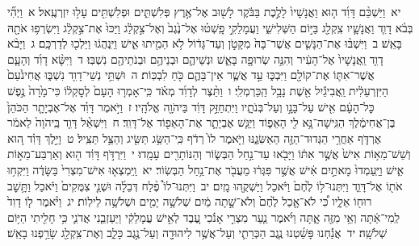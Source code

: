 \documentclass[18pt]{article}
\begin{document}
 {\loc יא~}וַיַּשְׁכֵּ֨ם דָּוִ֜ד ה֤וּא וַאֲנָשָׁיו֙ לָלֶ֣כֶת בַּבֹּ֔קֶר לָשׁ֖וּב אֶל־אֶ֣רֶץ פְּלִשְׁתִּ֑ים וּפְלִשְׁתִּ֖ים עָל֥וּ יִזְרְעֶֽאל׃ 
\startlock
 {\loc א~}וַיְהִ֞י בְּבֹ֨א דָוִ֧ד וַאֲנָשָׁ֛יו צִֽקְלַ֖ג בַּיּ֣וֹם הַשְּׁלִישִׁ֑י וַעֲמָלֵקִ֣י פָֽשְׁט֗וּ אֶל־נֶ֙גֶב֙ וְאֶל־צִ֣קְלַ֔ג וַיַּכּוּ֙ אֶת־צִ֣קְלַ֔ג וַיִּשְׂרְפ֥וּ אֹתָ֖הּ בָּאֵֽשׁ׃ \startlock
 {\loc ב~}וַיִּשְׁבּ֨וּ אֶת־הַנָּשִׁ֤ים אֲשֶׁר־בָּהּ֙ מִקָּטֹ֣ן וְעַד־גָּד֔וֹל לֹ֥א הֵמִ֖יתוּ אִ֑ישׁ וַיִּֽנְהֲג֔וּ וַיֵּלְכ֖וּ לְדַרְכָּֽם׃ \startlock
 {\loc ג~}וַיָּבֹ֨א דָוִ֤ד וַֽאֲנָשָׁיו֙ אֶל־הָעִ֔יר וְהִנֵּ֥ה שְׂרוּפָ֖ה בָּאֵ֑שׁ וּנְשֵׁיהֶ֛ם וּבְנֵיהֶ֥ם וּבְנֹתֵיהֶ֖ם נִשְׁבּֽוּ׃ \startlock
 {\loc ד~}וַיִּשָּׂ֨א דָוִ֜ד וְהָעָ֧ם אֲשֶׁר־אִתּ֛וֹ אֶת־קוֹלָ֖ם וַיִּבְכּ֑וּ עַ֣ד אֲשֶׁ֧ר אֵין־בָּהֶ֛ם כֹּ֖חַ לִבְכּֽוֹת׃ \startlock
 {\loc ה~}וּשְׁתֵּ֥י נְשֵׁי־דָוִ֖ד נִשְׁבּ֑וּ אֲחִינֹ֙עַם֙ הַיִּזְרְעֵלִ֔ית וַֽאֲבִיגַ֕יִל אֵ֖שֶׁת נָבָ֥ל הַֽכַּרְמְלִֽי׃ \startlock
 {\loc ו~}וַתֵּ֨צֶר לְדָוִ֜ד מְאֹ֗ד כִּֽי־אָמְר֤וּ הָעָם֙ לְסׇקְל֔וֹ כִּי־מָ֙רָה֙ נֶ֣פֶשׁ כׇּל־הָעָ֔ם אִ֖ישׁ עַל־בָּנָ֣ו וְעַל־בְּנֹתָ֑יו וַיִּתְחַזֵּ֣ק דָּוִ֔ד בַּיהֹוָ֖ה אֱלֹהָֽיו׃ \startlock
 {\loc ז~}וַיֹּ֣אמֶר דָּוִ֗ד אֶל־אֶבְיָתָ֤ר הַכֹּהֵן֙ בֶּן־אֲחִימֶ֔לֶךְ הַגִּֽישָׁה־נָּ֥א לִ֖י הָאֵפ֑וֹד וַיַּגֵּ֧שׁ אֶבְיָתָ֛ר אֶת־הָאֵפ֖וֹד אֶל־דָּוִֽד׃ \startlock
 {\loc ח~}וַיִּשְׁאַ֨ל דָּוִ֤ד בַּֽיהֹוָה֙ לֵאמֹ֔ר אֶרְדֹּ֛ף אַחֲרֵ֥י הַגְּדוּד־הַזֶּ֖ה הַאַשִּׂגֶ֑נּוּ וַיֹּ֤אמֶר לוֹ֙ רְדֹ֔ף כִּֽי־הַשֵּׂ֥ג תַּשִּׂ֖יג וְהַצֵּ֥ל תַּצִּֽיל׃ \startlock
 {\loc ט~}וַיֵּ֣לֶךְ דָּוִ֗ד ה֚וּא וְשֵׁשׁ־מֵא֥וֹת אִישׁ֙ אֲשֶׁ֣ר אִתּ֔וֹ וַיָּבֹ֖אוּ עַד־נַ֣חַל הַבְּשׂ֑וֹר וְהַנּוֹתָרִ֖ים עָמָֽדוּ׃ \startlock
 {\loc י~}וַיִּרְדֹּ֣ף דָּוִ֔ד ה֖וּא וְאַרְבַּע־מֵא֣וֹת אִ֑ישׁ וַיַּֽעַמְדוּ֙ מָאתַ֣יִם אִ֔ישׁ אֲשֶׁ֣ר פִּגְּר֔וּ מֵעֲבֹ֖ר אֶת־נַ֥חַל הַבְּשֽׂוֹר׃ \startlock
 {\loc יא~}וַֽיִּמְצְא֤וּ אִישׁ־מִצְרִי֙ בַּשָּׂדֶ֔ה וַיִּקְח֥וּ אֹת֖וֹ אֶל־דָּוִ֑ד וַיִּתְּנוּ־ל֥וֹ לֶ֙חֶם֙ וַיֹּ֔אכַל וַיַּשְׁקֻ֖הוּ מָֽיִם׃ \startlock
 {\loc יב~}וַיִּתְּנוּ־לוֹ֩ פֶ֨לַח דְּבֵלָ֜ה וּשְׁנֵ֤י צִמֻּקִים֙ וַיֹּ֔אכַל וַתָּ֥שׇׁב רוּח֖וֹ אֵלָ֑יו כִּ֠י לֹא־אָ֤כַל לֶ֙חֶם֙ וְלֹא־שָׁ֣תָה מַ֔יִם שְׁלֹשָׁ֥ה יָמִ֖ים וּשְׁלֹשָׁ֥ה לֵילֽוֹת׃ \startlock
 {\loc יג~}וַיֹּ֨אמֶר ל֤וֹ דָוִד֙ לְֽמִי־אַ֔תָּה וְאֵ֥י מִזֶּ֖ה אָ֑תָּה וַיֹּ֜אמֶר נַ֧עַר מִצְרִ֣י אָנֹ֗כִי עֶ֚בֶד לְאִ֣ישׁ עֲמָלֵקִ֔י וַיַּעַזְבֵ֧נִי אֲדֹנִ֛י כִּ֥י חָלִ֖יתִי הַיּ֥וֹם שְׁלֹשָֽׁה׃ \startlock
 {\loc יד~}אֲנַ֡חְנוּ פָּשַׁ֜טְנוּ נֶ֧גֶב הַכְּרֵתִ֛י וְעַל־אֲשֶׁ֥ר לִיהוּדָ֖ה וְעַל־נֶ֣גֶב כָּלֵ֑ב וְאֶת־צִֽקְלַ֖ג שָׂרַ֥פְנוּ בָאֵֽשׁ׃ \startlock
\end{document}

